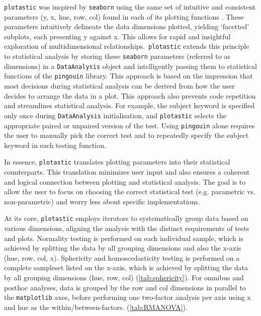 




\texttt{plotastic} was inspired by \texttt{seaborn} using the same set of intuitive
and consistent parameters (y, x, hue, row, col) found in each of its
plotting functions \cite{waskomSeabornStatisticalData2021}. These parameters
intuitively delineate the data dimensions plotted, yielding `facetted'
subplots, each presenting y against x. This allows for rapid and
insightful exploration of multidimensional relationships.~\texttt{plotastic}
extends this principle to statistical analysis by storing these
\texttt{seaborn} parameters (referred to as dimensions) in a \texttt{DataAnalysis}
object and intelligently passing them to statistical functions of the
\texttt{pingouin} library. This approach is based on the impression that most
decisions during statistical analysis can be derived from how the user
decides to arrange the data in a plot. This approach also prevents code
repetition and streamlines statistical analysis. For example, the
subject keyword is specified only once during \texttt{DataAnalysis}
initialisation, and \texttt{plotastic} selects the appropriate paired or
unpaired version of the test. Using \texttt{pingouin} alone requires the user
to manually pick the correct test and to repeatedly specify the subject
keyword in each testing function.

In essence, \texttt{plotastic} translates plotting parameters into their
statistical counterparts. This translation minimizes user input and also
ensures a coherent and logical connection between plotting and
statistical analysis. The goal is to allow the user to focus on choosing
the correct statistical test (e.g. parametric vs. non-parametric) and
worry less about specific implementations.

At its core, \texttt{plotastic} employs iterators to systematically group data
based on various dimensions, aligning the analysis with the distinct
requirements of tests and plots. Normality testing is performed on each
individual sample, which is achieved by splitting the data by all
grouping dimensions and also the x-axis (hue, row, col, x). Sphericity
and homoscedasticity testing is performed on a complete sampleset listed
on the x-axis, which is achieved by splitting the data by all grouping
dimensions (hue, row, col)  (\autoref{tab:sphericity}). For omnibus and
posthoc analyses, data is grouped by the row and col dimensions in
parallel to the \texttt{matplotlib} axes, before performing one two-factor
analysis per axis using x and hue as the within/between-factors.
(\autoref{tab:RMANOVA}).

